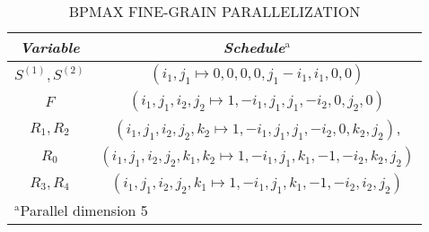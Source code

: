 \begin{table}[htbp]
\caption{\uppercase{BPMax fine-grain Parallelization}}
\begin{center}
\begin{tabular}{|c|c|}
\hline
\textbf{\textit{Variable}}& \textbf{\textit{Schedule}}$^{\mathrm{a}}$ \\
\hline
  $S^{(1)}, S^{(2)}$ & $(i_{1},j_{1} \mapsto 0, 0, 0, 0, j_{1}-i_{1}, i_{1}, 0, 0)$   \\
\cline{1-2} 
  $F$ & $(i_{1},j_{1},i_{2},j_{2} \mapsto 1, -i_{1}, j_{1}, j_{1}, -i_{2}, 0, j_{2},0)$   \\
\cline{1-2} 
$R_{1}, R_{2}$ & $(i_{1},j_{1},i_{2},j_{2},k_{2} \mapsto 1, -i_{1}, j_{1}, j_{1}, -i_{2}, 0, k_{2}, j_{2})$,    \\
 \cline{1-2} 
 $R_{0}$ & $(i_{1},j_{1},i_{2},j_{2},k_{1},k_{2} \mapsto 1, -i_{1}, j_{1}, k_{1}, -1, -i_{2}, k_{2}, j_{2})$  \\
\cline{1-2} 
 $R_{3}, R_{4}$ & $(i_{1},j_{1},i_{2},j_{2},k_{1} \mapsto 1, -i_{1}, j_{1}, k_{1}, -1, -i_{2}, i_{2}, j_{2})$   \\
 \cline{1-2} 
\hline
\multicolumn{2}{l}{$^{\mathrm{a}}$Parallel dimension 5}
\end{tabular}
\label{tab:bpm_fine_grain_schedule}
\end{center}
\end{table}